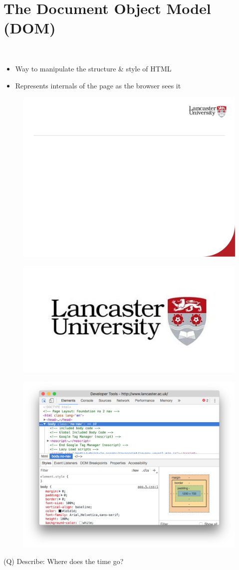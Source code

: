 \documentclass[12pt]{article}
\begin{document}
\section{The Document Object Model (DOM)}
\\
\begin{itemize}
  \item Way to manipulate the structure \& style of HTML
  \item Represents internals of the page as the browser sees it
\end{itemize}
\begin{figure}[H]
\includegraphics[width=0.5\linewidth]{page32-image-1.png}
\end{figure}
\begin{figure}[H]
\includegraphics[width=0.5\linewidth]{page32-image-2.png}
\end{figure}
\begin{figure}[H]
\includegraphics[width=0.5\linewidth]{page32-image-3.png}
\end{figure}
\clearpage
(Q)
Describe: Where does the time go?
\clearpage
\end{document}
